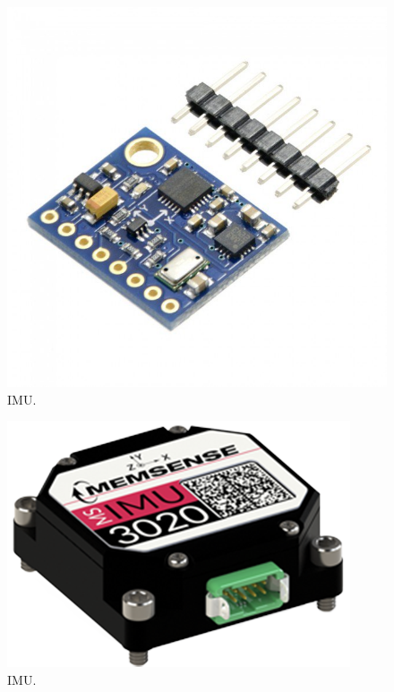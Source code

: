 \begin{figure}[H]
	\center
	\includegraphics[scale=0.2]{imagenes/Balancing_robot/IMU1}
	\caption{IMU.}
	\label{fig:IMU12}
\end{figure}

\begin{figure}[H]
	\center
	\includegraphics[scale=0.2]{imagenes/Balancing_robot/IMU2}
	\caption{IMU.}
	\label{fig:IMU2}
\end{figure}


